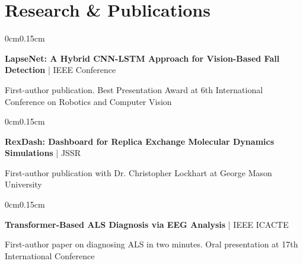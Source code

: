 \documentclass[10pt, letterpaper]{article}
\newenvironment{onecolentry}{
    \begin{adjustwidth}{0cm}{0.15cm}
}{
    \end{adjustwidth}
}
\begin{document}
    \vspace{0.05cm}
    \section{Research \& Publications}
    \vspace{0.1cm}

    \begin{onecolentry}
        \textbf{LapseNet: A Hybrid CNN-LSTM Approach for Vision-Based Fall Detection} | IEEE Conference
        
        \vspace{0.05cm}
        First-author publication. Best Presentation Award at 6th International Conference on Robotics and Computer Vision
    \end{onecolentry}

    \vspace{0.05cm}

    \begin{onecolentry}
        \textbf{RexDash: Dashboard for Replica Exchange Molecular Dynamics Simulations} | JSSR
        
        \vspace{0.05cm}
        First-author publication with Dr. Christopher Lockhart at George Mason University
    \end{onecolentry}

    \vspace{0.05cm}

    \begin{onecolentry}
        \textbf{Transformer-Based ALS Diagnosis via EEG Analysis} | IEEE ICACTE
        
        \vspace{0.05cm}
        First-author paper on diagnosing ALS in two minutes. Oral presentation at 17th International Conference
    \end{onecolentry}

    \vspace{0.1cm}
\end{document}

